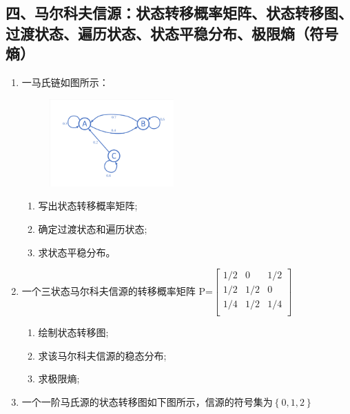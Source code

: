 \documentclass[normal,cyan]{elegantnote}
\begin{document}
\subsection*{四、马尔科夫信源：状态转移概率矩阵、状态转移图、过渡状态、遍历状态、状态平稳分布、极限熵（符号熵）}
\begin{enumerate}
    \item 一马氏链如图所示：
    \begin{figure}[H]
        \centering
        \includegraphics[width=0.45\textwidth]{figure/fig3.pdf}
    \end{figure}
    \begin{enumerate}
        \item 写出状态转移概率矩阵;
        \vspace*{0.3cm}
        \item 确定过渡状态和遍历状态;
        \vspace*{0.3cm}
        \item 求状态平稳分布。
    \end{enumerate}
    \vspace*{0.8cm}
    \item 一个三状态马尔科夫信源的转移概率矩阵
    P=$\begin{bmatrix}
        1/2 & 0 & 1/2 \\
        1/2 & 1/2 & 0 \\
        1/4 & 1/2 & 1/4 \\
    \end{bmatrix}$
    \begin{enumerate}
        \item  绘制状态转移图;
        \vspace*{0.3cm}
        \item 求该马尔科夫信源的稳态分布;
        \vspace*{0.3cm}
        \item 求极限熵;
    \end{enumerate}
    \vspace*{0.8cm}
    \item 一个一阶马氏源的状态转移图如下图所示，信源的符号集为$\left\{0,1,2\right\}$

\end{enumerate}
\end{document}
